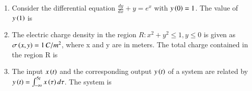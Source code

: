 \documentclass[journal,12pt,onecolumn]{IEEEtran}
\theoremstyle{remark}
\begin{document}
\begin{enumerate}
\item Consider the differential equation $\frac{dy}{dx} + y = e^x$ with $y\left(0\right) = 1$. The value of $y\left(1\right)$ is

\hfill{}
\begin{enumerate}  \end{enumerate}



\item The electric charge density in the region $R\colon x^2+y^2 \le 1, y \le 0$ is given as $\sigma\left(x,y\right) = 1 \, C/m^2$, where x and y are in meters. The total charge  contained in the region R is
\hfill{}\begin{enumerate}  \end{enumerate}



\item The input $x\left(t\right)$ and the corresponding output $y\left(t\right)$ of a system are related by $y\left(t\right) = \int_{-\infty}^{5t} x\left(\tau\right) d\tau$. The system is
\hfill{}\begin{enumerate}  \end{enumerate}




\end{enumerate}
\end{document}
